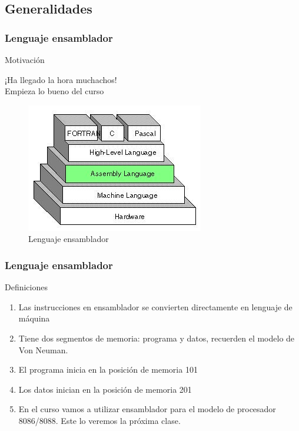 \documentclass{beamer}
\begin{document}
\subsection{Generalidades}

\begin{frame}
		\frametitle{Lenguaje ensamblador}
		\begin{block}{Motivación}
		\begin{center}
			\large{¡Ha llegado la hora muchachos!\\Empieza lo bueno del curso}
			\begin{figure}[H]
				\centering
				\includegraphics[scale=0.6]{imagenes/ensamblador.jpg}
				\caption{Lenguaje ensamblador}
			\end{figure}
		\end{center}
	\end{block}		 		
\end{frame}


\begin{frame}
		\frametitle{Lenguaje ensamblador}
		\begin{block}{Definiciones}
		\begin{center}
			\begin{enumerate}
				\item Las instrucciones en ensamblador se convierten directamente en lenguaje de máquina
				\item Tiene dos segmentos de memoria: programa y datos, recuerden el modelo de Von Neuman.
				\item El programa inicia en la posición de memoria 101
				\item Los datos inician en la posición de memoria 201
				\item En el curso vamos a utilizar ensamblador para el modelo de procesador 8086/8088. Este lo veremos la próxima clase.
			\end{enumerate}
		\end{center}
	\end{block}		 		
\end{frame}
\end{document}
